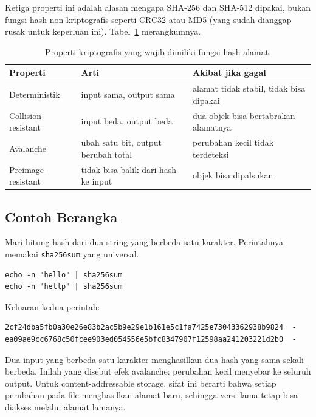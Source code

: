 \documentclass[11pt,a4paper]{article}
\begin{document}
Ketiga properti ini adalah alasan mengapa SHA-256 dan SHA-512 dipakai, bukan fungsi hash non-kriptografis seperti CRC32 atau MD5 (yang sudah dianggap rusak untuk keperluan ini). Tabel~\ref{tab:hash-props} merangkumnya.

\begin{table}[H]
	\centering
	\caption{Properti kriptografis yang wajib dimiliki fungsi hash alamat.}
	\label{tab:hash-props}
	\small
	\begin{tabularx}{\textwidth}{l X X}
		\toprule
		Properti            & Arti                                & Akibat jika gagal                       \\
		\midrule
		Deterministik       & input sama, output sama             & alamat tidak stabil, tidak bisa dipakai \\
		Collision-resistant & input beda, output beda             & dua objek bisa bertabrakan alamatnya    \\
		Avalanche           & ubah satu bit, output berubah total & perubahan kecil tidak terdeteksi        \\
		Preimage-resistant  & tidak bisa balik dari hash ke input & objek bisa dipalsukan                   \\
		\bottomrule
	\end{tabularx}
\end{table}

\subsection{Contoh Berangka}

Mari hitung hash dari dua string yang berbeda satu karakter. Perintahnya memakai \texttt{sha256sum} yang universal.

\begin{lstlisting}[style=code]
echo -n "hello" | sha256sum
echo -n "hellp" | sha256sum
\end{lstlisting}

Keluaran kedua perintah:

\begin{lstlisting}[style=out]
2cf24dba5fb0a30e26e83b2ac5b9e29e1b161e5c1fa7425e73043362938b9824  -
ea09ae9cc6768c50fcee903ed054556e5bfc8347907f12598aa241203221d2b0  -
\end{lstlisting}

Dua input yang berbeda satu karakter menghasilkan dua hash yang sama sekali berbeda. Inilah yang disebut efek avalanche: perubahan kecil menyebar ke seluruh output. Untuk content-addressable storage, sifat ini berarti bahwa setiap perubahan pada file menghasilkan alamat baru, sehingga versi lama tetap bisa diakses melalui alamat lamanya.
\end{document}
